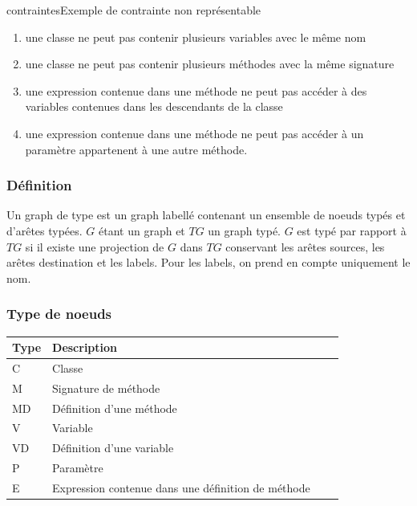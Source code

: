 \documentclass[a4paper, 12pt]{article}
\begin{document}
  \begin{myfig}{contraintes}{Exemple de contrainte non représentable}
    \begin{enumerate}
      \item \scriptsize une classe ne peut pas contenir plusieurs variables avec le même nom
      \item \scriptsize une classe ne peut pas contenir plusieurs méthodes avec la même signature
      \item \scriptsize une expression contenue dans une méthode ne peut pas accéder à des variables contenues dans les descendants de la classe
      \item \scriptsize une expression contenue dans une méthode ne peut pas accéder à un paramètre appartenent à une autre méthode.
    \end{enumerate}
  \end{myfig}

  \subsubsection{Définition}
  Un graph de type est un graph labellé contenant un ensemble de noeuds typés et d'arêtes typées. \(G\) étant un graph et \(TG\) un graph typé. \(G\) est typé par rapport à \(TG\) si il existe une projection
  de \(G\) dans \(TG\) conservant les arêtes sources, les arêtes destination et les labels. Pour les labels, on prend en compte uniquement le nom.

  \subsubsection{Type de noeuds}

  \begin{tabular}{ | l | l | l | p{5cm} |}
    \hline
    Type & Description  \\ \hline
    C & Classe   \\ \hline
    M & Signature de méthode   \\ \hline
    MD &  Définition d'une méthode   \\ \hline
    V &  Variable   \\ \hline
    VD &  Définition d'une variable \\ \hline
    P & Paramètre \\ \hline
    E &  Expression contenue dans une définition de méthode \\ \hline
  \end{tabular}
\end{document}
